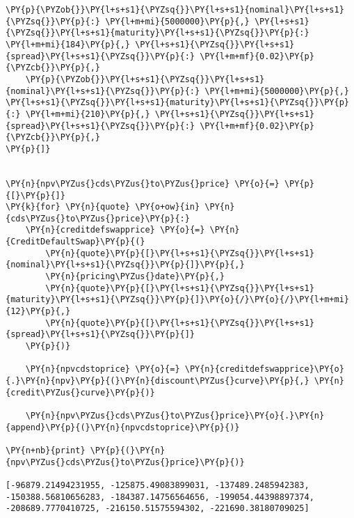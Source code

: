 \begin{Answer}
\begin{tcolorbox}[size=fbox, boxrule=1pt, pad at break*=1mm,colback=cellbackground, colframe=cellborder]
\begin{Verbatim}[commandchars=\\\{\}]
    \PY{p}{\PYZob{}}\PY{l+s+s1}{\PYZsq{}}\PY{l+s+s1}{nominal}\PY{l+s+s1}{\PYZsq{}}\PY{p}{:} \PY{l+m+mi}{5000000}\PY{p}{,} \PY{l+s+s1}{\PYZsq{}}\PY{l+s+s1}{maturity}\PY{l+s+s1}{\PYZsq{}}\PY{p}{:} \PY{l+m+mi}{184}\PY{p}{,} \PY{l+s+s1}{\PYZsq{}}\PY{l+s+s1}{spread}\PY{l+s+s1}{\PYZsq{}}\PY{p}{:} \PY{l+m+mf}{0.02}\PY{p}{\PYZcb{}}\PY{p}{,}
    \PY{p}{\PYZob{}}\PY{l+s+s1}{\PYZsq{}}\PY{l+s+s1}{nominal}\PY{l+s+s1}{\PYZsq{}}\PY{p}{:} \PY{l+m+mi}{5000000}\PY{p}{,} \PY{l+s+s1}{\PYZsq{}}\PY{l+s+s1}{maturity}\PY{l+s+s1}{\PYZsq{}}\PY{p}{:} \PY{l+m+mi}{210}\PY{p}{,} \PY{l+s+s1}{\PYZsq{}}\PY{l+s+s1}{spread}\PY{l+s+s1}{\PYZsq{}}\PY{p}{:} \PY{l+m+mf}{0.02}\PY{p}{\PYZcb{}}\PY{p}{,}
\PY{p}{]}


\PY{n}{npv\PYZus{}cds\PYZus{}to\PYZus{}price} \PY{o}{=} \PY{p}{[}\PY{p}{]}
\PY{k}{for} \PY{n}{quote} \PY{o+ow}{in} \PY{n}{cds\PYZus{}to\PYZus{}price}\PY{p}{:}
    \PY{n}{creditdefswapprice} \PY{o}{=} \PY{n}{CreditDefaultSwap}\PY{p}{(}
        \PY{n}{quote}\PY{p}{[}\PY{l+s+s1}{\PYZsq{}}\PY{l+s+s1}{nominal}\PY{l+s+s1}{\PYZsq{}}\PY{p}{]}\PY{p}{,}              
        \PY{n}{pricing\PYZus{}date}\PY{p}{,}
        \PY{n}{quote}\PY{p}{[}\PY{l+s+s1}{\PYZsq{}}\PY{l+s+s1}{maturity}\PY{l+s+s1}{\PYZsq{}}\PY{p}{]}\PY{o}{/}\PY{o}{/}\PY{l+m+mi}{12}\PY{p}{,}
        \PY{n}{quote}\PY{p}{[}\PY{l+s+s1}{\PYZsq{}}\PY{l+s+s1}{spread}\PY{l+s+s1}{\PYZsq{}}\PY{p}{]}   
    \PY{p}{)}

    \PY{n}{npvcdstoprice} \PY{o}{=} \PY{n}{creditdefswapprice}\PY{o}{.}\PY{n}{npv}\PY{p}{(}\PY{n}{discount\PYZus{}curve}\PY{p}{,} \PY{n}{credit\PYZus{}curve}\PY{p}{)}
    
    \PY{n}{npv\PYZus{}cds\PYZus{}to\PYZus{}price}\PY{o}{.}\PY{n}{append}\PY{p}{(}\PY{n}{npvcdstoprice}\PY{p}{)}

\PY{n+nb}{print} \PY{p}{(}\PY{n}{npv\PYZus{}cds\PYZus{}to\PYZus{}price}\PY{p}{)}

[-96879.21494231955, -125875.49083899031, -137489.2485942383,
-150388.56810656283, -184387.14756564656, -199054.44398897374,
-208689.7770410725, -216150.51575594302, -221690.38180709025]
    \end{Verbatim}
\end{tcolorbox}
\end{Answer}
